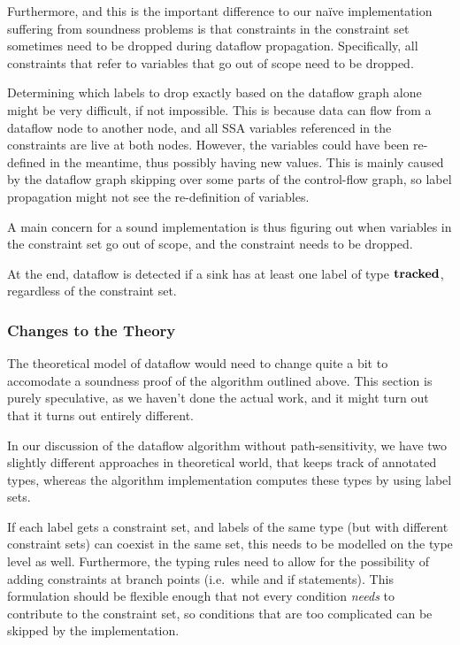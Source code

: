 Furthermore, and this is the important difference to our na\"ive implementation suffering from
soundness problems is that constraints in the constraint set sometimes need to be dropped 
during dataflow propagation.
Specifically, all constraints that refer to variables that go out of scope need to be dropped.

Determining which labels to drop exactly based on the dataflow graph alone might
be very difficult, if not impossible.
This is because data can flow from a dataflow node to another node,
and all SSA variables referenced in the constraints are live at both nodes.
However, the variables could have been re-defined in the meantime, thus possibly having new values.
This is mainly caused by the dataflow graph skipping over some parts of the
control-flow graph, so label propagation might not see the re-definition of variables.

A main concern for a sound implementation is thus figuring out when variables in the
constraint set go out of scope, and the constraint needs to be dropped.

At the end, dataflow is detected if a sink has at least one label of type $\textbf{tracked}$,
regardless of the constraint set.

\subsubsection*{Changes to the Theory}
The theoretical model of dataflow would need to change quite a bit to accomodate 
a soundness proof of the algorithm outlined above.
This section is purely speculative, as we haven't done the actual work, and it might turn out
that it turns out entirely different.

In our discussion of the dataflow algorithm without path-sensitivity, we have two slightly
different approaches in theoretical world, that keeps track of annotated types, whereas
the algorithm implementation computes these types by using label sets.

If each label gets a constraint set, and labels of the same type (but with different constraint sets)
can coexist in the same set, this needs to be modelled on the type level as well.
Furthermore, the typing rules need to allow for the possibility of adding constraints at
branch points (i.e.\ while and if statements).
This formulation should be flexible enough that not every condition \emph{needs}
to contribute to the constraint set, so conditions that are too complicated can be skipped
by the implementation.


